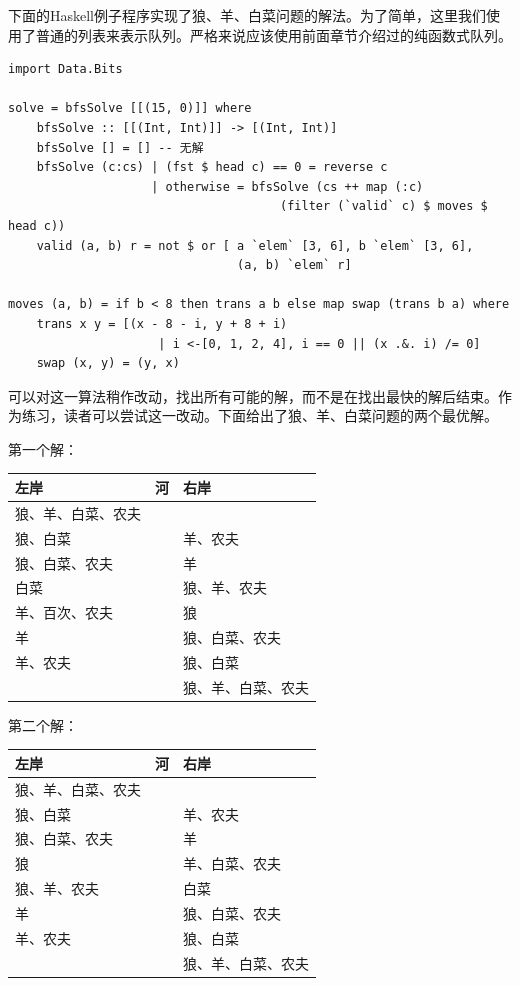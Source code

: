 \documentclass[b5paper]{ctexart}
\begin{document}
下面的Haskell例子程序实现了狼、羊、白菜问题的解法。为了简单，这里我们使用了普通的列表来表示队列。严格来说应该使用前面章节介绍过的纯函数式队列。

\begin{lstlisting}[style=Haskell]
import Data.Bits

solve = bfsSolve [[(15, 0)]] where
    bfsSolve :: [[(Int, Int)]] -> [(Int, Int)]
    bfsSolve [] = [] -- 无解
    bfsSolve (c:cs) | (fst $ head c) == 0 = reverse c
                    | otherwise = bfsSolve (cs ++ map (:c)
                                      (filter (`valid` c) $ moves $ head c))
    valid (a, b) r = not $ or [ a `elem` [3, 6], b `elem` [3, 6],
                                (a, b) `elem` r]

moves (a, b) = if b < 8 then trans a b else map swap (trans b a) where
    trans x y = [(x - 8 - i, y + 8 + i)
                     | i <-[0, 1, 2, 4], i == 0 || (x .&. i) /= 0]
    swap (x, y) = (y, x)
\end{lstlisting}

可以对这一算法稍作改动，找出所有可能的解，而不是在找出最快的解后结束。作为练习，读者可以尝试这一改动。下面给出了狼、羊、白菜问题的两个最优解。

第一个解：

\begin{tabular}{l|c|l}
左岸 & 河 & 右岸 \\
\hline
狼、羊、白菜、农夫 &   & \\
狼、白菜 &   & 羊、农夫 \\
狼、白菜、农夫 &   & 羊 \\
白菜 &   & 狼、羊、农夫 \\
羊、百次、农夫 &   & 狼 \\
羊 &   & 狼、白菜、农夫 \\
羊、农夫 &   & 狼、白菜 \\
 &  & 狼、羊、白菜、农夫
\end{tabular}

第二个解：

\begin{tabular}{l|c|l}
左岸 & 河 & 右岸 \\
\hline
狼、羊、白菜、农夫 & & \\
狼、白菜 & & 羊、农夫 \\
狼、白菜、农夫 & & 羊 \\
狼 & & 羊、白菜、农夫 \\
狼、羊、农夫 & & 白菜 \\
羊 & & 狼、白菜、农夫 \\
羊、农夫 & & 狼、白菜 \\
 & & 狼、羊、白菜、农夫
\end{tabular}
\end{document}
